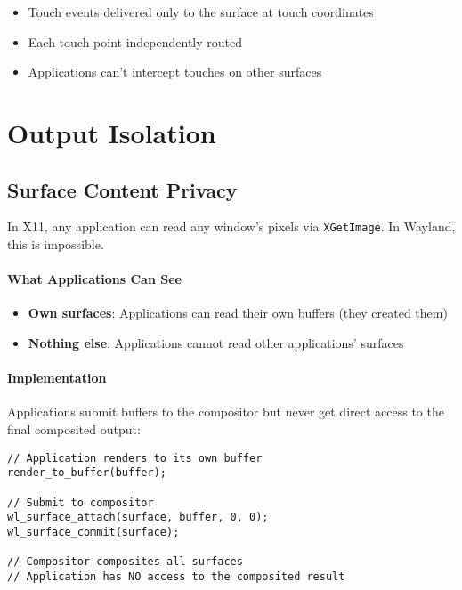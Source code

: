 \begin{itemize}
    \item Touch events delivered only to the surface at touch coordinates
    \item Each touch point independently routed
    \item Applications can't intercept touches on other surfaces
\end{itemize}

\section{Output Isolation}

\subsection{Surface Content Privacy}

In X11, any application can read any window's pixels via \texttt{XGetImage}. In Wayland, this is impossible.

\paragraph{What Applications Can See}

\begin{itemize}
    \item \textbf{Own surfaces}: Applications can read their own buffers (they created them)
    \item \textbf{Nothing else}: Applications cannot read other applications' surfaces
\end{itemize}

\paragraph{Implementation}

Applications submit buffers to the compositor but never get direct access to the final composited output:

\begin{lstlisting}[style=cstyle, caption=Surface Submission]
// Application renders to its own buffer
render_to_buffer(buffer);

// Submit to compositor
wl_surface_attach(surface, buffer, 0, 0);
wl_surface_commit(surface);

// Compositor composites all surfaces
// Application has NO access to the composited result
\end{lstlisting}


